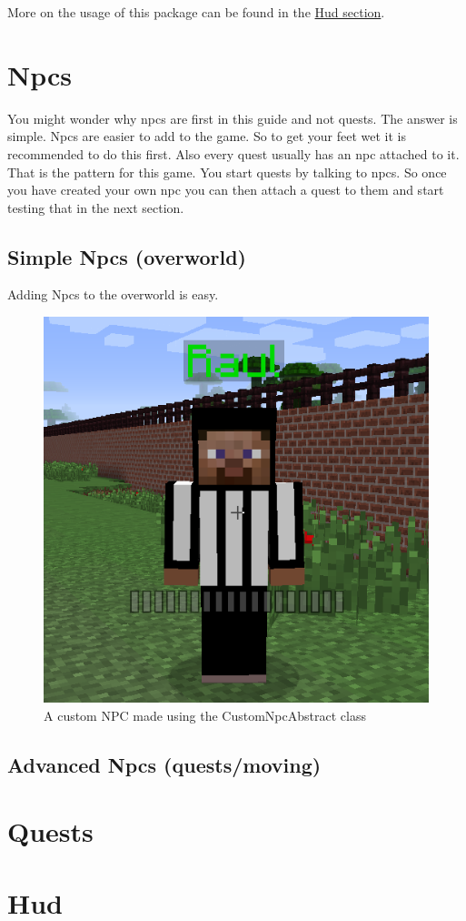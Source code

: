\documentclass[12pt]{article}
\begin{document}
More on the usage of this package can be found in the \hyperref[sec:hud]{Hud section}.

\section{Npcs}
\label{sec:npcs}

You might wonder why npcs are first in this guide and not quests. The answer is simple. Npcs are easier to add to the game. So to get your feet wet it is recommended to do this first. Also every quest usually has an npc attached to it. That is the pattern for this game. You start quests by talking to npcs. So once you have created your own npc you can then attach a quest to them and start testing that in the next section.

\subsection{Simple Npcs (overworld)}

Adding Npcs to the overworld is easy.
\begin{figure}[h]
	\caption{A custom NPC made using the CustomNpcAbstract class}
	\includegraphics[scale=0.5]{images/npcs/Raul.png}
	\centering
\end{figure}



\subsection{Advanced Npcs (quests/moving)}

\section{Quests}
\label{sec:quests}

\section{Hud}
\label{sec:hud}
\end{document}
